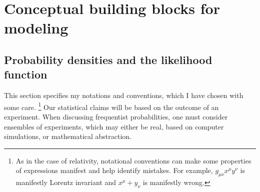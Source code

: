 \documentclass{cernrep}
\begin{document}
\section{Conceptual building blocks for modeling}

\subsection{Probability densities and the likelihood function}

This section specifies my notations and conventions, which I have chosen with some care.%
%
\footnote{As in the case of relativity, notational conventions can make some properties of expressions manifest and help identify mistakes.  For example, $g_{\mu\nu}x^\mu y^\nu$ is manifestly Lorentz invariant and $x^\mu + y_\nu$ is manifestly wrong.}  Our statistical claims will be based on the outcome of an experiment.  When discussing frequentist probabilities, one must consider ensembles of experiments, which may either be real, based on computer simulations, or mathematical abstraction.
\end{document}
